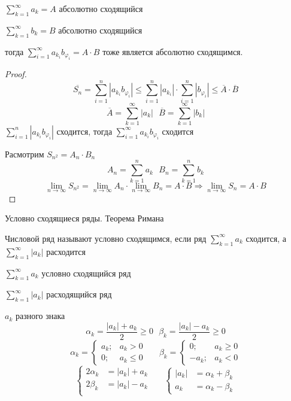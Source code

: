 \begin{theorem}
  $\sum_{k=1}^{\infty} a_k = A$ абсолютно сходящийся

  $\sum_{k=1}^{\infty} b_k = B$ абсолютно сходящийся

  тогда $\sum_{i=1}^{\infty} a_{k_i} b_{\varphi_i} = A \cdot B$ тоже является
  абсолютно сходящимся.
\end{theorem}

\begin{proof}
  $$
  \overline{S_n} = \sum_{i=1}^n |a_{k_i} b_{\varphi_i}| \le
  \sum_{i=1}^n |a_{k_i}| \cdot \sum_{i=1}^n |b_{\varphi_i}| \le
  \overline{A} \cdot \overline{B}
  $$
  $$
  \overline{A} = \sum_{k=1}^{\infty} |a_k| ~~~
  \overline{B} = \sum_{k=1}^{\infty} |b_k|
  $$
  $\sum_{i=1}^n |a_{k_i} b_{\varphi_i}|$ сходится, тогда
  $\sum_{i=1}^{\infty} a_{k_i} b_{\varphi_i}$ сходится

  Расмотрим $S_{n^2} = A_n \cdot B_n$
  $$
  A_n = \sum_{k=1}^n a_k ~~~ B_n = \sum_{k=1}^n b_k
  $$
  $$
  \lim_{n \to \infty} S_{n^2} = \lim_{n \to \infty} A_n \cdot
  \lim_{n \to \infty} B_n = A \cdot B \Rightarrow \lim_{n \to \infty} S_n =
  A \cdot B
  $$
\end{proof}

\begin{title}[\Large]
  Условно сходящиеся ряды. Теорема Римана
\end{title}

\begin{defin}
  Числовой ряд называют условно сходящимся, если ряд $\sum_{k=1}^{\infty} a_k$
  сходится, а $\sum_{k=1}^{\infty} |a_k|$ расходится
\end{defin}

\begin{block}[Свойство]
  $\sum_{k=1}^{\infty} a_k$ условно сходящийся ряд

  $\sum_{k=1}^{\infty} |a_k|$ расходящийся ряд

  $a_k$ разного знака
  $$
  \alpha_k = \frac{|a_k| + a_k}{2} \ge 0 ~~~
  \beta_k = \frac{|a_k| - a_k}{2} \ge 0
  $$
  $$
  \alpha_k =
  \left\{
  \begin{array}{ll}
    a_k; & a_k > 0 \\
    0; & a_k \le 0
  \end{array}
  \right.
  ~~~~~~~
  \beta_k =
  \left\{
  \begin{array}{ll}
    0; & a_k \ge 0 \\
    -a_k; & a_k < 0
  \end{array}
  \right.
  $$
  $$
  \left\{
  \begin{array}{ll}
    2\alpha_k & = |a_k| + a_k \\
    2\beta_k & = |a_k| - a_k \\
  \end{array}
  \right.
  ~~~~~~~
  \left\{
  \begin{array}{ll}
    |a_k| & = \alpha_k + \beta_k \\
    a_k & = \alpha_k - \beta_k
  \end{array}
  \right.
  $$
\end{block}

